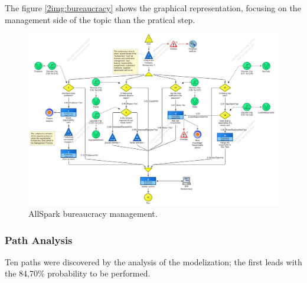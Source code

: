 The figure \ref{2img:bureaucracy} shows the graphical representation, focusing on the management side of the topic than the pratical step.\\

\begin{figure}[ht!]
\begin{centering}
\includegraphics[scale=0.35, angle=90]{assign2/adonis/imgs/bureaucracy.jpg}
\caption{AllSpark bureaucracy management.}
\label{2img:bureacracy}
\end{centering}
\end{figure}


\subsubsection{Path Analysis}
Ten paths were discovered by the analysis of the modelization; the first leads with the 84,70\% probability to be performed. 

